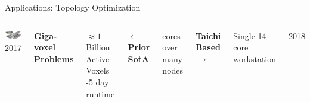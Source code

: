 \placelogofalse
\begin{frame}{Applications: Topology Optimization}
\begin{columns}

  \centering
  \begin{center}
  \vspace{0.5cm}
  \includegraphics[width=3.0cm]{giga_opt_diagram.png}\\
  2017 \cite{Aage2017}
  \end{center}

  \centering
  \textbf{Giga-voxel Problems}
  \begin{outline}
  \1 $\approx 1$ Billion Active Voxels
  -5 day runtime
  \end{outline}
  \vspace{0.5cm}
  \textbf{$\leftarrow$ Prior SotA}
  \begin{outline}
   cores over many nodes
  \end{outline}
  \vspace{0.5cm}
  \textbf{Taichi Based $\rightarrow$}
  \begin{outline}
  \1 Single 14 core workstation  
  \end{outline}

  \centering
  \begin{center}
  \vspace{0.5cm}
  2018 \cite{Liu2018}
  \end{center}
\end{columns}
\end{frame}
\placelogotrue


